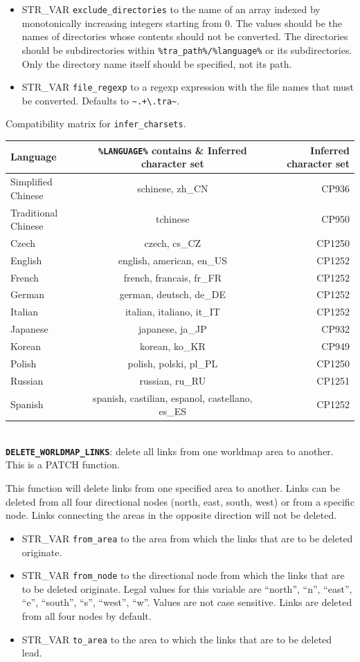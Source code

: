 \documentclass{article}
\def\DEFINE#1{{\tt \bf #1}\label{#1}\index{#1}}
\def\t#1{{\tt #1}}
\begin{document}
\begin{itemize}
\item STR_VAR \verb+exclude_directories+ to the name of an array indexed by monotonically increasing integers starting from 0. The values should be the names of directories whose contents should not be converted. The directories should be subdirectories within \verb+%tra_path%/%language%+ or its subdirectories. Only the directory name itself should be specified, not its path.
\item STR_VAR \verb+file_regexp+ to a regexp expression with the file names that must be converted. Defaults to \verb+~+\t{.+\textbackslash.tra}\verb+~+.
\end{itemize}

Compatibility matrix for \verb+infer_charsets+.
\begin{tabular} {l c r}
\hline
Language & \verb+%LANGUAGE%+ contains & Inferred character set \\
\hline
Simplified Chinese & schinese, zh_CN & CP936 \\
Traditional Chinese & tchinese & CP950 \\
Czech & czech, cs_CZ & CP1250 \\
English & english, american, en_US & CP1252 \\
French & french, francais, fr_FR & CP1252 \\
German & german, deutsch, de_DE & CP1252 \\
Italian & italian, italiano, it_IT & CP1252 \\
Japanese & japanese, ja_JP & CP932 \\
Korean & korean, ko_KR & CP949 \\
Polish & polish, polski, pl_PL & CP1250 \\
Russian & russian, ru_RU & CP1251 \\
Spanish & spanish, castilian, espanol, castellano, es_ES & CP1252 \\
\hline
\end{tabular}
\\

\DEFINE{\verb+DELETE_WORLDMAP_LINKS+}: delete all links from one worldmap area to another. This is a PATCH function.

This function will delete links from one specified area to another. Links can be deleted from all four directional nodes (north, east, south, west) or from a specific node. Links connecting the areas in the opposite direction will not be deleted.

\begin{itemize}
\item STR_VAR \verb+from_area+ to the area from which the links that are to be deleted originate.
\item STR_VAR \verb+from_node+ to the directional node from which the links that are to be deleted originate. Legal values for this variable are ``north'', ``n'', ``east'', ``e'', ``south'', ``s'', ``west'', ``w''. Values are not case sensitive. Links are deleted from all four nodes by default.
\item STR_VAR \verb+to_area+ to the area to which the links that are to be deleted lead.
\end{itemize}
\\
\end{document}

